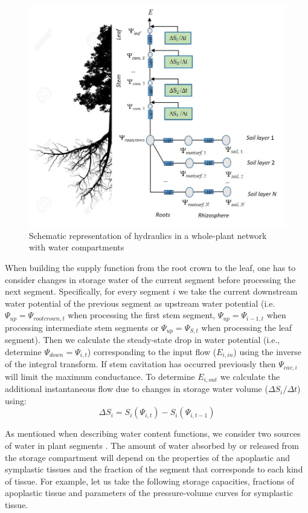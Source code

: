 \documentclass[]{book}
\begin{document}
\begin{figure}

{\centering \includegraphics[width=0.8\linewidth]{hydraulics_full} 

}

\caption{Schematic representation of hydraulics in a whole-plant network with water compartments}\label{fig:unnamed-chunk-44}
\end{figure}

When building the supply function from the root crown to the leaf, one has to consider changes in storage water of the current segment before processing the next segment. Specifically, for every segment \(i\) we take the current downstream water potential of the previous segment as upstream water potential (i.e. \(\Psi_{up} = \Psi_{rootcrown, t}\) when processing the first stem segment, \(\Psi_{up} = \Psi_{i-1, t}\) when processing intermediate stem segments or \(\Psi_{up} = \Psi_{S, t}\) when processing the leaf segment). Then we calculate the steady-state drop in water potential (i.e., determine \(\Psi_{down} = \Psi_{i, t}\)) corresponding to the input flow (\(E_{i,in}\)) using the inverse of the integral transform. If stem cavitation has occurred previously then \(\Psi_{cav,i}\) will limit the maximum conductance. To determine \(E_{i,out}\) we calculate the additional instantaneous flow due to changes in storage water volume (\(\Delta S_{i}/\Delta t\)) using:
\begin{equation}
\Delta S_{i} = S_i(\Psi_{i, t}) - S_i(\Psi_{i, t-1})
\end{equation}

As mentioned when describing water content functions, we consider two sources of water in plant segments \citep{Tyree1990}. The amount of water absorbed by or released from the storage compartment will depend on the properties of the apoplastic and symplastic tissues and the fraction of the segment that corresponds to each kind of tissue. For example, let us take the following storage capacities, fractions of apoplastic tissue and parameters of the pressure-volume curves for symplastic tissue.
\end{document}
